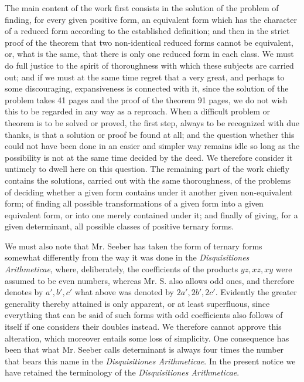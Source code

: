 \documentclass[12pt]{article}
\begin{document}
The main content of the work first consists in the solution of the problem of finding, for every given positive form, an equivalent form which has the character of a reduced form according to the established definition; and then in the strict proof of the theorem that two non-identical reduced forms cannot be equivalent, or, what is the same, that there is only one reduced form in each class. We must do full justice to the spirit of thoroughness with which these subjects are carried out; and if we must at the same time regret that a very great, and perhaps to some discouraging, expansiveness is connected with it, since the solution of the problem takes 41 pages and the proof of the theorem 91 pages, we do not wish this to be regarded in any way as a reproach. When a difficult problem or theorem is to be solved or proved, the first step, always to be recognized with due thanks, is that a solution or proof be found at all; and the question whether this could not have been done in an easier and simpler way remains idle so long as the possibility is not at the same time decided by the deed. We therefore consider it untimely to dwell here on this question. The remaining part of the work chiefly contains the solutions, carried out with the same thoroughness, of the problems of deciding whether a given form contains under it another given non-equivalent form; of finding all possible transformations of a given form into a given equivalent form, or into one merely contained under it; and finally of giving, for a given determinant, all possible classes of positive ternary forms.

We must also note that Mr. Seeber has taken the form of ternary forms somewhat differently from the way it was done in the \textit{Disquisitiones Arithmeticae}, where, deliberately, the coefficients of the products $yz,xz,xy$ were assumed to be even numbers, whereas Mr. S. also allows odd ones, and therefore denotes by $a',b',c'$ what above was denoted by $2a',2b',2c'$. Evidently the greater generality thereby attained is only apparent, or at least superfluous, since everything that can be said of such forms with odd coefficients also follows of itself if one considers their doubles instead. We therefore cannot approve this alteration, which moreover entails some loss of simplicity. One consequence has been that what Mr. Seeber calls determinant is always four times the number that bears this name in the \textit{Disquisitiones Arithmeticae}. In the present notice we have retained the terminology of the \textit{Disquisitiones Arithmeticae}.
\end{document}
